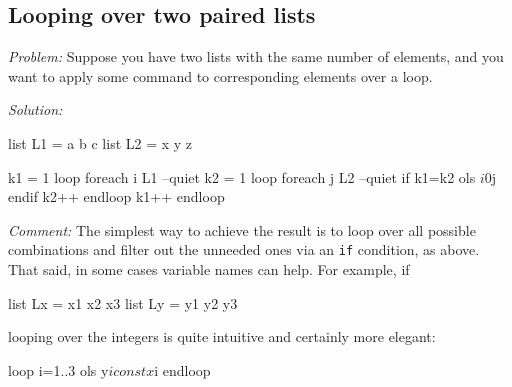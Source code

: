 \subsection{Looping over two paired lists}

\emph{Problem:} Suppose you have two lists with the same number of
elements, and you want to apply some command to corresponding elements
over a loop.

\emph{Solution:}
\begin{code}
list L1 = a b c
list L2 = x y z

k1 = 1
loop foreach i L1 --quiet
    k2 = 1
    loop foreach j L2 --quiet
        if k1=k2
            ols $i 0 $j
        endif
        k2++
    endloop
    k1++
endloop
\end{code}

\emph{Comment:} The simplest way to achieve the result is to loop over
all possible combinations and filter out the unneeded ones via an
\texttt{if} condition, as above. That said, in some cases variable
names can help. For example, if
\begin{code}
  list Lx = x1 x2 x3
  list Ly = y1 y2 y3
\end{code}
looping over the integers is quite intuitive and certainly more elegant:
\begin{code}
  loop i=1..3
    ols y$i const x$i
  endloop
\end{code}

